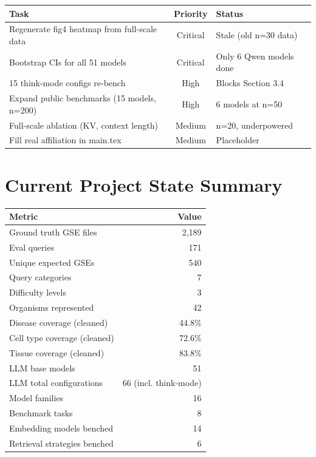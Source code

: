 \documentclass[11pt,a4paper]{article}
\begin{document}
\begin{longtable}{@{}p{6cm}cp{5cm}@{}}
\toprule
Task & Priority & Status \\
\midrule
Regenerate fig4 heatmap from full-scale data & Critical & Stale (old n=30 data) \\
Bootstrap CIs for all 51 models & Critical & Only 6 Qwen models done \\
15 think-mode configs re-bench & High & Blocks Section 3.4 \\
Expand public benchmarks (15 models, n=200) & High & 6 models at n=50 \\
Full-scale ablation (KV, context length) & Medium & n=20, underpowered \\
Fill real affiliation in main.tex & Medium & Placeholder \\
\bottomrule
\end{longtable}

\section{Current Project State Summary}

\begin{tabular}{@{}lr@{}}
\toprule
Metric & Value \\
\midrule
Ground truth GSE files       & 2{,}189 \\
Eval queries                 & 171 \\
Unique expected GSEs         & 540 \\
Query categories             & 7 \\
Difficulty levels            & 3 \\
Organisms represented        & 42 \\
Disease coverage (cleaned)   & 44.8\% \\
Cell type coverage (cleaned) & 72.6\% \\
Tissue coverage (cleaned)    & 83.8\% \\
LLM base models              & 51 \\
LLM total configurations     & 66 (incl. think-mode) \\
Model families               & 16 \\
Benchmark tasks              & 8 \\
Embedding models benched     & 14 \\
Retrieval strategies benched & 6 \\
\bottomrule
\end{tabular}
\end{document}

